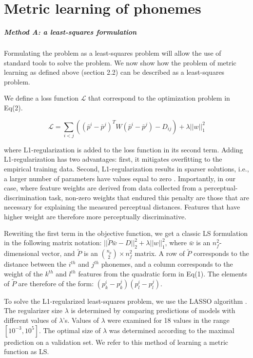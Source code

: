 \chapter{Metric learning of phonemes}
\paragraph{Method A: a least-squares formulation}
Formulating the problem as a least-squares problem will allow the use of standard tools to solve the problem. We now show how the problem of metric learning as defined above (section 2.2) can be described as a least-squares problem. 

We define a loss function $\mathcal{L}$ that correspond to the optimization problem in Eq(2).

\begin{equation}
    \mathcal{L} = \sum_{{i} < {j}}{((\bar{p}^i - \bar{p}^j)^TW(\bar{p}^i - \bar{p}^j) - D_{ij})} + \lambda||w||_1^2
\end{equation}

where L1-regularization is added to the loss function in its second term. Adding L1-regularization has two advantages: first, it mitigates overfitting to the empirical training data. Second, L1-regularization results in sparser solutions, i.e., a larger number of parameters have values equal to zero \citep{Tibshirani1996}. Importantly, in our case, where feature weights are derived from data collected from a perceptual-discrimination task, non-zero weights that endured this penalty are those that are necessary for explaining the measured perceptual distances. Features that have higher weight are therefore more perceptually discriminative. 

Rewriting the first term in the objective function, we get a classic LS formulation in the following matrix notation: $||\widetilde{P}\bar{w} - D||_2^2 + \lambda||w||_1^2$, where $\bar{w}$ is an $n_f^2$-dimensional vector, and $\widetilde{P}$ is an ${n_p \choose 2} \times n_f^2$ matrix. A row of $\widetilde{P}$ corresponds to the distance between the $i^{th}$ and $j^{th}$ phonemes, and a column corresponds to the weight of the $k^{th}$ and $l^{th}$ features from the quadratic form in Eq(1). The elements of $\widetilde{P}$ are therefore of the form: $(p_k^i-p_k^j)(p_l^i-p_l^j)$.

To solve the L1-regularized least-squares problem, we use the LASSO algorithm \citep{Tibshirani1996}. The regularizer size $\lambda$ is determined by comparing predictions of models with different values of $\lambda$'s. Values of $\lambda$ were examined for 18 values in the range $[10^{-3}, 10^5]$. The optimal size of $\lambda$ was determined according to the maximal prediction on a validation set. We refer to this method of learning a metric function as LS.


